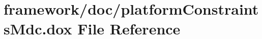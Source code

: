 \hypertarget{platform_constraints_mdc_8dox}{}\section{framework/doc/platform\+Constraints\+Mdc.dox File Reference}
\label{platform_constraints_mdc_8dox}

